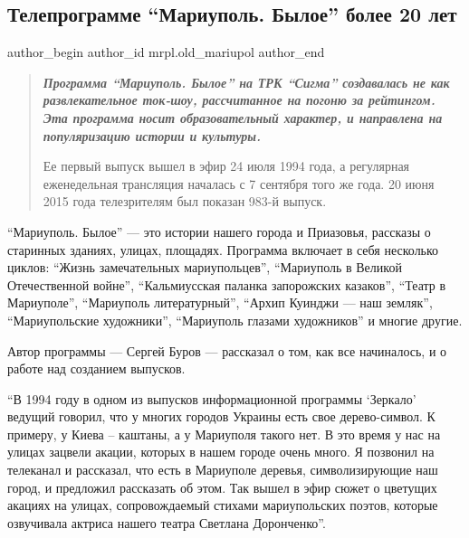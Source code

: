  
 
 
 
 
 
\subsection{Телепрограмме \enquote{Мариуполь. Былое} более 20 лет}
\label{sec:29_06_2015.stz.mrpl.old_mariupol.1.teleprogramme_mariupol_byloe_bolee_20_let}
 
\ifcmt
 author_begin
   author_id mrpl.old_mariupol
 author_end
\fi

\begin{quote}
\em\bfseries
Программа \enquote{Мариуполь. Былое} на ТРК \enquote{Сигма} создавалась не как
развлекательное ток-шоу, рассчитанное на погоню за рейтингом. Эта программа
носит образовательный характер, и направлена на популяризацию истории и
культуры.

Ее первый выпуск вышел в эфир 24 июля 1994 года, а регулярная еженедельная
трансляция началась с 7 сентября того же года. 20 июня 2015 года телезрителям
был показан 983-й выпуск.
\end{quote}

\enquote{Мариуполь. Былое} — это истории нашего города и Приазовья, рассказы о
старинных зданиях, улицах, площадях. Программа включает в себя несколько
циклов: \enquote{Жизнь замечательных мариупольцев}, \enquote{Мариуполь в Великой Отечественной
войне}, \enquote{Кальмиусская паланка запорожских казаков}, \enquote{Театр в Мариуполе},
\enquote{Мариуполь литературный}, \enquote{Архип Куинджи — наш земляк}, \enquote{Мариупольские
художники}, \enquote{Мариуполь глазами художников} и многие другие.


Автор программы — Сергей Буров — рассказал о том, как все начиналось, и о
работе над созданием выпусков.

\enquote{В 1994 году в одном из выпусков информационной программы \enquote{Зеркало} ведущий
говорил, что у многих городов Украины есть свое дерево-символ. К примеру, у
Киева – каштаны, а у Мариуполя такого нет. В это время у нас на улицах зацвели
акации, которых в нашем городе очень много. Я позвонил на телеканал и
рассказал, что есть в Мариуполе деревья, символизирующие наш город, и предложил
рассказать об этом. Так вышел в эфир сюжет о цветущих акациях на улицах,
сопровождаемый стихами мариупольских поэтов, которые озвучивала актриса нашего
театра Светлана Доронченко}.

